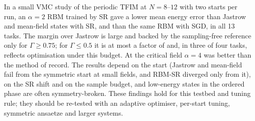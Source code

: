 In a small VMC study of the periodic TFIM at $N=8$--$12$ with two starts per run, an $\alpha{=}2$ RBM trained by SR gave a lower mean energy error than Jastrow and mean-field states with SR, and than the same RBM with SGD, in all 13 tasks. The margin over Jastrow is large and backed by the sampling-free reference only for $\Gamma\ge0.75$; for $\Gamma\le0.5$ it is at most a factor of  and, in three of four tasks, reflects optimisation under this budget. At the critical field $\alpha{=}4$ was better than the method of record. The results depend on the start (Jastrow and mean-field fail from the symmetric start at small fields, and RBM-SR diverged only from it), on the SR shift and on the sample budget, and low-energy states in the ordered phase are often symmetry-broken. These findings hold for this testbed and tuning rule; they should be re-tested with an adaptive optimiser, per-start tuning, symmetric ansaetze and larger systems.
